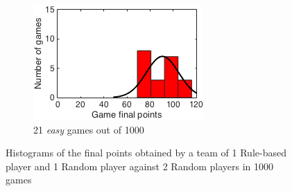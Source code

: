 \begin{figure}[h]
\begin{subfigure}[h]{0.32\textwidth}
                \includegraphics[width=\textwidth]{./img/appendix/histBeasy}
                \caption{21 \emph{easy} games out of 1000}
                \label{app:histBeasy}
        \end{subfigure}
        \caption[Histograms of the final points obtained in scenario (b) for \emph{hard}, \emph{medium} and \emph{easy} hands]{Histograms of the final points obtained by a team of 1 Rule-based player and 1 Random player against 2 Random players in 1000 games}
        \label{app:histogramsB}
\end{figure}

